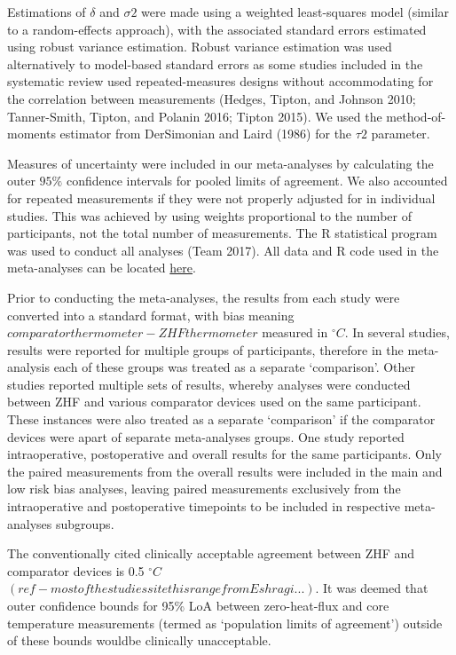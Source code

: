 \documentclass[smallextended]{svjour3}       %
\begin{document}
Estimations of \(\delta\) and \(\sigma2\) were made using a weighted
least-squares model (similar to a random-effects approach), with the
associated standard errors estimated using robust variance estimation.
Robust variance estimation was used alternatively to model-based
standard errors as some studies included in the systematic review used
repeated-measures designs without accommodating for the correlation
between measurements (Hedges, Tipton, and Johnson 2010; Tanner-Smith,
Tipton, and Polanin 2016; Tipton 2015). We used the method-of-moments
estimator from DerSimonian and Laird (1986) for the \(\tau2\) parameter.

Measures of uncertainty were included in our meta-analyses by
calculating the outer \(95\%\) confidence intervals for pooled limits of
agreement. We also accounted for repeated measurements if they were not
properly adjusted for in individual studies. This was achieved by using
weights proportional to the number of participants, not the total number
of measurements. The R statistical program was used to conduct all
analyses (Team 2017). All data and R code used in the meta-analyses can
be located \href{}{here}.

Prior to conducting the meta-analyses, the results from each study were
converted into a standard format, with bias meaning
\(comparator thermometer-ZHF thermometer\) measured in \(^\circ C\). In
several studies, results were reported for multiple groups of
participants, therefore in the meta-analysis each of these groups was
treated as a separate `comparison'. Other studies reported multiple sets
of results, whereby analyses were conducted between ZHF and various
comparator devices used on the same participant. These instances were
also treated as a separate `comparison' if the comparator devices were
apart of separate meta-analyses groups. One study reported
intraoperative, postoperative and overall results for the same
participants. Only the paired measurements from the overall results were
included in the main and low risk bias analyses, leaving paired
measurements exclusively from the intraoperative and postoperative
timepoints to be included in respective meta-analyses subgroups.

The conventionally cited clinically acceptable agreement between ZHF and
comparator devices is 0.5 \(^\circ C\)
\((ref - most of the studies site this range from Eshragi...)\). It was
deemed that outer confidence bounds for 95\% LoA between zero-heat-flux
and core temperature measurements (termed as `population limits of
agreement') outside of these bounds wouldbe clinically unacceptable.
\end{document}
